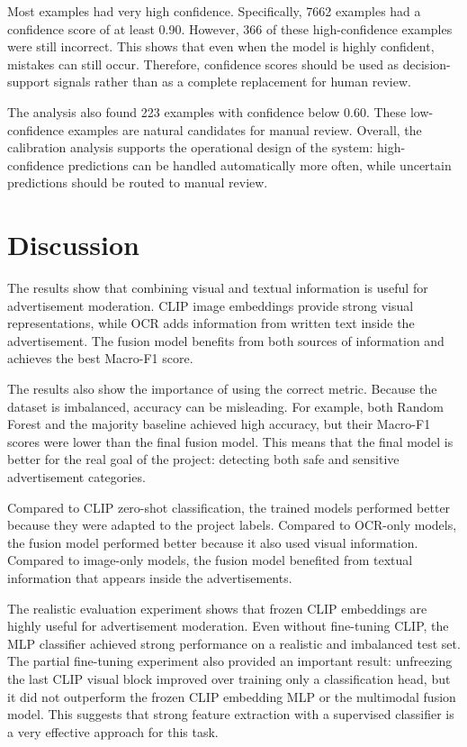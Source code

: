 \documentclass[12pt]{article}
\begin{document}
Most examples had very high confidence. Specifically, 7662 examples had a confidence score of at least 0.90. However, 366 of these high-confidence examples were still incorrect. This shows that even when the model is highly confident, mistakes can still occur. Therefore, confidence scores should be used as decision-support signals rather than as a complete replacement for human review.

The analysis also found 223 examples with confidence below 0.60. These low-confidence examples are natural candidates for manual review. Overall, the calibration analysis supports the operational design of the system: high-confidence predictions can be handled automatically more often, while uncertain predictions should be routed to manual review.

\section{Discussion}

The results show that combining visual and textual information is useful for advertisement moderation. CLIP image embeddings provide strong visual representations, while OCR adds information from written text inside the advertisement. The fusion model benefits from both sources of information and achieves the best Macro-F1 score.

The results also show the importance of using the correct metric. Because the dataset is imbalanced, accuracy can be misleading. For example, both Random Forest and the majority baseline achieved high accuracy, but their Macro-F1 scores were lower than the final fusion model. This means that the final model is better for the real goal of the project: detecting both safe and sensitive advertisement categories.

Compared to CLIP zero-shot classification, the trained models performed better because they were adapted to the project labels. Compared to OCR-only models, the fusion model performed better because it also used visual information. Compared to image-only models, the fusion model benefited from textual information that appears inside the advertisements.

The realistic evaluation experiment shows that frozen CLIP embeddings are highly useful for advertisement moderation. Even without fine-tuning CLIP, the MLP classifier achieved strong performance on a realistic and imbalanced test set. The partial fine-tuning experiment also provided an important result: unfreezing the last CLIP visual block improved over training only a classification head, but it did not outperform the frozen CLIP embedding MLP or the multimodal fusion model. This suggests that strong feature extraction with a supervised classifier is a very effective approach for this task.
\end{document}
